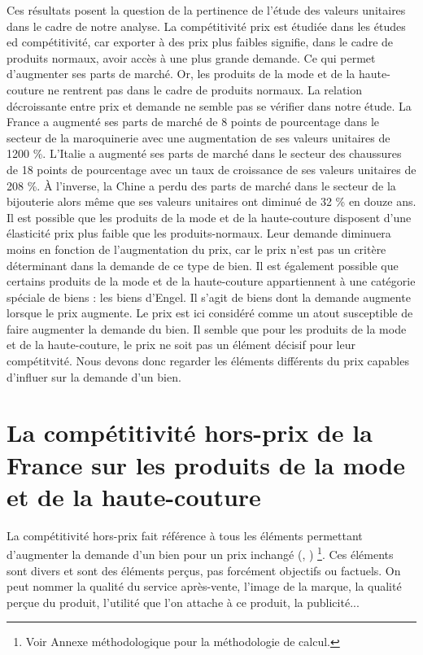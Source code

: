 \documentclass[french,10pt,a4paper]{article}
\begin{document}
\bigskip

Ces résultats posent la question de la pertinence de l'étude des valeurs unitaires dans le cadre de notre analyse. La compétitivité prix est étudiée dans les études ed compétitivité, car exporter à des prix plus faibles signifie, dans le cadre de \og produits normaux\fg{}, avoir accès à une plus grande demande. Ce qui permet d'augmenter ses parts de marché. Or, les produits de la mode et de la haute-couture ne rentrent pas dans le cadre de \og produits normaux\fg{}. La relation décroissante entre prix et demande ne semble pas se vérifier dans notre étude. La France a augmenté ses parts de marché de 8 points de pourcentage dans le secteur de la maroquinerie avec une augmentation de ses valeurs unitaires de 1200 \%. L'Italie a augmenté ses parts de marché dans le secteur des chaussures de 18 points de pourcentage avec un taux de croissance de ses valeurs unitaires de 208 \%. À l'inverse, la Chine a perdu des parts de marché dans le secteur de la bijouterie alors même que ses valeurs unitaires ont diminué de 32 \% en douze ans. Il est possible que les produits de la mode et de la haute-couture disposent d'une élasticité prix plus faible que les \og produits-normaux\fg{}. Leur demande diminuera moins en fonction de l'augmentation du prix, car le prix n'est pas un critère déterminant dans la demande de ce type de bien. Il est également possible que certains produits de la mode et de la haute-couture appartiennent à une catégorie spéciale de biens : les \og biens d'Engel\fg{}. Il s'agit de biens dont la demande augmente lorsque le prix augmente. Le prix est ici considéré comme un atout susceptible de faire augmenter la demande du bien. Il semble que pour les produits de la mode et de la haute-couture, le prix ne soit pas un élément décisif pour leur compétitvité. Nous devons donc regarder les éléments différents du prix capables d'influer sur la demande d'un bien. 


\section{La compétitivité hors-prix de la France sur les produits de la mode et de la haute-couture}

La compétitivité hors-prix fait référence à tous les éléments permettant d'augmenter la demande d'un bien pour un prix inchangé (\cite{Khandelwal2013}, \cite{Bas2015}) \footnote{Voir Annexe méthodologique pour la méthodologie de calcul.}. Ces éléments sont divers et sont des éléments perçus, pas forcément objectifs ou factuels. On peut nommer la qualité du service après-vente, l'image de la marque, la qualité perçue du produit, l'utilité que l'on attache à ce produit, la publicité... 
\end{document}
